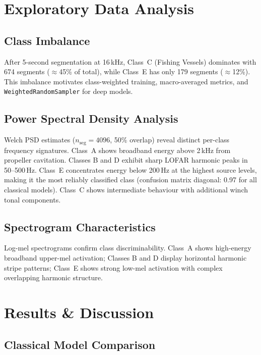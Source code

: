 \documentclass[conference]{IEEEtran}
\begin{document}
\section{Exploratory Data Analysis}

\subsection{Class Imbalance}

After 5-second segmentation at 16\,kHz, Class~C (Fishing Vessels)
dominates with 674 segments ($\approx$45\% of total), while Class~E
has only 179 segments ($\approx$12\%). This imbalance motivates
class-weighted training, macro-averaged metrics, and
\texttt{WeightedRandomSampler} for deep models.

\subsection{Power Spectral Density Analysis}

Welch PSD estimates ($n_\mathrm{seg}=4096$, 50\% overlap) reveal
distinct per-class frequency signatures. Class~A shows broadband energy
above 2\,kHz from propeller cavitation. Classes B and D exhibit sharp
LOFAR harmonic peaks in 50--500\,Hz. Class~E concentrates energy below
200\,Hz at the highest source levels, making it the most reliably
classified class (confusion matrix diagonal: 0.97 for all classical
models). Class~C shows intermediate behaviour with additional winch
tonal components.

\subsection{Spectrogram Characteristics}

Log-mel spectrograms confirm class discriminability. Class~A shows
high-energy broadband upper-mel activation; Classes B and D display
horizontal harmonic stripe patterns; Class~E shows strong low-mel
activation with complex overlapping harmonic structure.

\section{Results \& Discussion}

\subsection{Classical Model Comparison}
\end{document}
